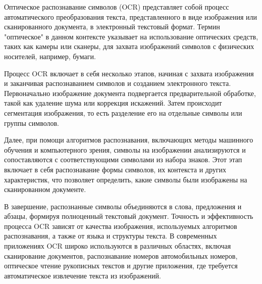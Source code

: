 
Оптическое распознавание символов (OCR) представляет собой процесс автоматического преобразования текста, представленного в виде изображения или сканированного документа, в электронный текстовый формат. Термин "оптическое" в данном контексте указывает на использование оптических средств, таких как камеры или сканеры, для захвата изображений символов с физических носителей, например, бумаги.

Процесс OCR включает в себя несколько этапов, начиная с захвата изображения и заканчивая распознаванием символов и созданием электронного текста. Первоначально изображение документа подвергается предварительной обработке, такой как удаление шума или коррекция искажений. Затем происходит сегментация изображения, то есть разделение его на отдельные символы или группы символов.

Далее, при помощи алгоритмов распознавания, включающих методы машинного обучения и компьютерного зрения, символы на изображении анализируются и сопоставляются с соответствующими символами из набора знаков. Этот этап включает в себя распознавание формы символов, их контекста и других характеристик, что позволяет определить, какие символы были изображены на сканированном документе.

В завершение, распознанные символы объединяются в слова, предложения и абзацы, формируя полноценный текстовый документ. Точность и эффективность процесса OCR зависят от качества изображения, используемых алгоритмов распознавания, а также от языка и структуры текста. В современных приложениях OCR широко используются в различных областях, включая сканирование документов, распознавание номеров автомобильных номеров, оптическое чтение рукописных текстов и другие приложения, где требуется автоматическое извлечение текста из изображений.
